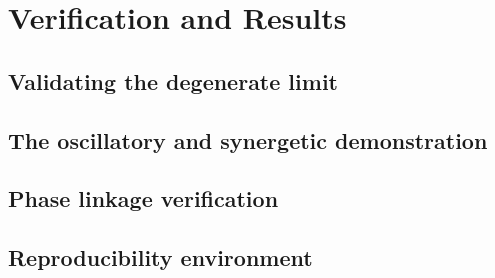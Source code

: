 
\section{Verification and Results}
\label{sec:verification}

\subsection{Validating the degenerate limit}
\label{sub:validating_the_degenerate_limit}

\subsection{The oscillatory and synergetic demonstration}
\label{sub:oscillatory_and_synergetic_demonstration}

\subsection{Phase linkage verification}
\label{sub:phase_linkage_verification}

\subsection{Reproducibility environment}
\label{sub:reproducibility_environment}

